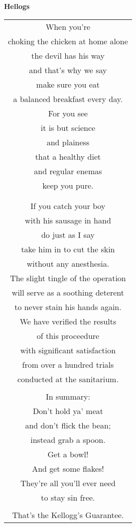 \documentclass{article}
\begin{document}
\begin{center}
\textbf{Hellogs} \\
\vspace*{2ex}
\begin{longtable}{c}
When you're \\
choking the chicken at home alone \\
the devil has his way \\
and that's why we say \\
make sure you eat \\
a balanced breakfast every day. \\
For you see \\
it is but science \\
and plainess \\
that a healthy diet \\
and regular enemas \\
keep you pure. \\
\\

\\
If you catch your boy \\
with his sausage in hand \\
do just as I say \\
take him in to cut the skin \\
without any anesthesia. \\
The slight tingle of the operation \\
will serve as a soothing deterent \\
to never stain his hands again. \\
We have verified the results \\
of this proceedure \\
with significant satisfaction \\
from over a hundred trials \\
conducted at the sanitarium. \\
\\
In summary: \\
Don't hold ya' meat \\
and don't flick the bean; \\
instead grab a spoon. \\
Get a bowl! \\
And get some flakes! \\
They're all you'll ever need \\
to stay sin free. \\
\\
That's the Kellogg's Guarantee. \\
\end{longtable}
\end{center}
\end{document}
